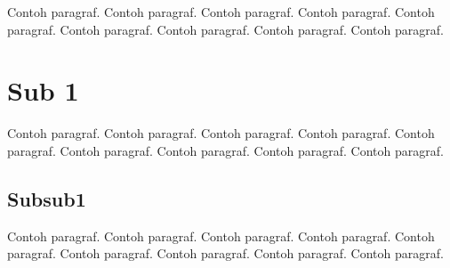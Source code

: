 \documentclass[a4paper,twoside,bahasa,nobib]{tufte-book}
\begin{document}
Contoh paragraf. Contoh paragraf. Contoh paragraf. Contoh paragraf.
Contoh paragraf. Contoh paragraf. Contoh paragraf. Contoh paragraf.
Contoh paragraf.

\section{Sub 1}

Contoh paragraf. Contoh paragraf. Contoh paragraf. Contoh paragraf.
Contoh paragraf. Contoh paragraf. Contoh paragraf. Contoh paragraf.
Contoh paragraf.

\subsection{Subsub1}

Contoh paragraf. Contoh paragraf. Contoh paragraf. Contoh paragraf.
Contoh paragraf. Contoh paragraf. Contoh paragraf. Contoh paragraf.
Contoh paragraf.
\end{document}
